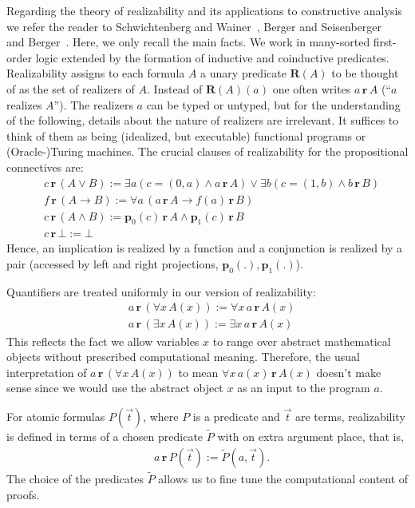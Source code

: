 \documentclass[microtype]{jloganal}
\theoremstyle{plain}
\theoremstyle{definition}
\newcommand{\rea}[2]{#1\,\mathbf{r}\,#2}
\newcommand{\prea}[1]{\mathbf{R}(#1)}
\newcommand{\reap}[1]{\widetilde{#1}}
\newcommand{\pleft}[1]{\mathbf{p}_0(#1)}
\newcommand{\pright}[1]{\mathbf{p}_1(#1)}
\begin{document}
Regarding the theory of realizability and its applications to constructive
analysis we refer the reader to Schwichtenberg and Wainer~\cite{SchwichtenbergWainer12},
Berger and Seisenberger~\cite{SeisenBerger10} and Berger~\cite{Berger11}. Here, we only recall the main
facts.
We work in many-sorted first-order logic extended by the formation
of inductive and coinductive predicates.
Realizability assigns to each formula $A$ a unary predicate $\prea{A}$
to be thought of as the set of realizers of $A$. Instead of $\prea{A}(a)$
one often writes $\rea{a}{A}$ (``$a$ realizes $A$'').
The realizers $a$ can be typed or untyped, but for the understanding of the 
following, details about the nature of realizers are irrelevant.
It suffices to think of them as being (idealized, but executable) functional
programs or (Oracle-)Turing machines.
The crucial clauses of realizability for the propositional connectives are:
\begin{align*}
&\rea{c}{(A \lor B)} := \exists a (c=(0,a) \land \rea{a}{A}) \lor 
             \exists b (c=(1,b) \land \rea{b}{B})\\
&\rea{f}{(A\to B)} := \forall a\,(\rea{a}{A}\to \rea{f(a)}{B})\\
&\rea{c}{(A \land B)} := \rea{\pleft{c}}{A} \land \rea{\pright{c}}{B}\\
&\rea{c}{\bot} := \bot
\end{align*}
Hence, an implication is realized by a function and a conjunction is realized
by a pair (accessed by left and right projections, $\pleft{.}, \pright{.}$).

Quantifiers are treated uniformly in our version of realizability:
\begin{align*}
&\rea{a}{(\forall x\,A(x))} := \forall x\,\rea{a}{A(x)}\\
&\rea{a}{(\exists x\,A(x))} := \exists x\,\rea{a}{A(x)}
\end{align*}
This reflects the fact we allow variables $x$ to range over abstract 
mathematical objects without prescribed computational meaning. Therefore, the
usual interpretation of $\rea{a}{(\forall x\,A(x))}$ to mean
$\forall x\,\rea{a(x)}{A(x)}$ doesn't make sense since we would use
the abstract object $x$ as an input to the program $a$.

For atomic formulas $P(\vec t)$, where $P$ is a predicate and $\vec t$ are 
terms, realizability is defined in terms of a chosen predicate $\reap{P}$ 
with on extra argument place, that is,
\begin{align*}
&\rea{a}{P(\vec t)} := \reap{P}(a,\vec t).
\end{align*}
The choice of the predicates $\reap{P}$ allows us to fine tune the computational
content of proofs.
\end{document}
